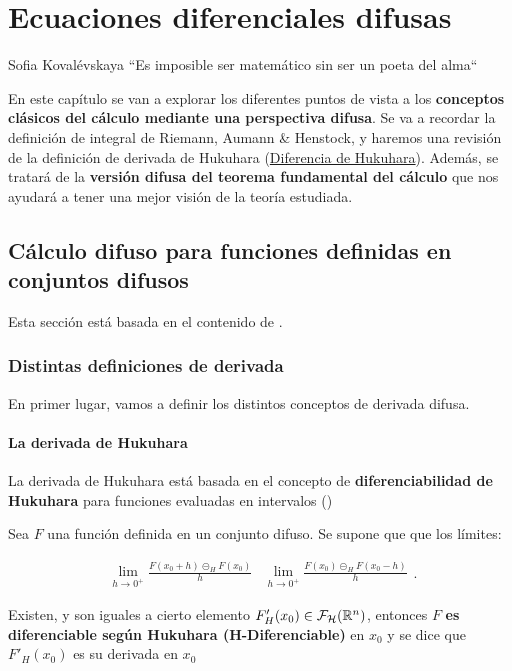 
\chapter{Ecuaciones diferenciales difusas}
\begin{chapquote}{Sofia Kovalévskaya}
	``Es imposible ser matemático sin ser un poeta del alma``
\end{chapquote}
En este capítulo se van a explorar los diferentes puntos de vista a los \textbf{conceptos clásicos del cálculo mediante una perspectiva difusa}. Se va a recordar la definición de integral de Riemann, Aumann \& Henstock, y haremos una revisión de la definición de derivada de Hukuhara (\hyperref[def:hukukara]{Diferencia de Hukuhara}). Además, se tratará de la \textbf{versión difusa del teorema fundamental del cálculo} que nos ayudará a tener una mejor visión de la teoría estudiada.

\section{Cálculo difuso para funciones definidas en conjuntos difusos}
Esta sección está basada en el contenido de \cite{fuzzyintro}.
\subsection{Distintas definiciones de derivada}
En primer lugar, vamos a definir los distintos conceptos de derivada difusa.

\subsubsection{La derivada de Hukuhara}
La derivada de Hukuhara está basada en el concepto de \textbf{diferenciabilidad de Hukuhara} para funciones evaluadas en intervalos (\cite{derivatehukuhara})

\begin{definicion}
  Sea $F$ una función definida en un conjunto difuso. Se supone que que los límites:
  
  \[
  \begin{array}{c||c}
    \lim\limits_{h \rightarrow 0^+} \frac{F(x_0 + h) \circleddash_H F(x_0)}{h} & \lim\limits_{h \rightarrow 0^+} \frac{F(x_0) \circleddash_H F(x_0 - h)}{h}
  \end{array}.
  \]
  
  Existen, y son iguales a cierto elemento $F'_H(x_0) \in \mathcal{F}_\mathcal{H}(\mathbb R^n)$, entonces $F$ \textbf{es diferenciable según Hukuhara (H-Diferenciable)} en $x_0$ y se dice que $F'_H(x_0)$ es su derivada en $x_0$ 
\end{definicion}

